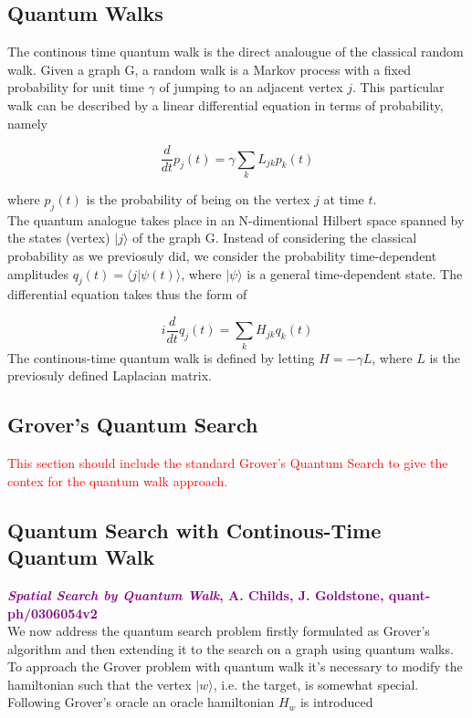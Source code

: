 \documentclass[aps,pra,reprint, onecolumn]{revtex4-2}
\newcommand{\red}[1]{\textcolor{red}{#1}}
\newcommand{\purple}[3]{\textcolor{purple}{\textbf{\textit{#1}, #2, #3}}}
\begin{document}
\subsection{Quantum Walks}
The continous time quantum walk is the direct analougue of the classical random walk. Given a graph G, a random walk is a Markov process with a fixed probability for unit time $\gamma$ of jumping to an adjacent vertex $j$. This particular walk can be described by a linear differential equation in terms of probability, namely

\begin{equation}
  \frac{d}{dt}p_j(t) = \gamma\sum_{k}L_{jk}p_k(t)
\end{equation}

where $p_j(t)$ is the probability of being on the vertex $j$ at time $t$.\\
The quantum analogue takes place in an N-dimentional Hilbert space spanned by the states (vertex) $|j\rangle$ of the graph G. Instead of considering the classical probability as we previosuly did, we consider the probability time-dependent amplitudes $q_j(t) = \langle j|\psi(t)\rangle$, where $|\psi\rangle$ is a general time-dependent state. The differential equation takes thus the form of

\begin{equation}
  i\frac{d}{dt}q_j(t) = \sum_{k}H_{jk}q_k(t)
\end{equation}
The continous-time quantum walk is defined by letting $H=-\gamma L$, where $L$ is the previosuly defined Laplacian matrix.

\subsection{Grover's Quantum Search}
\red{This section should include the standard Grover's Quantum Search to give the contex for the quantum walk approach.}

\subsection{Quantum Search with Continous-Time Quantum Walk}
\purple{Spatial Search by Quantum Walk}{A. Childs, J. Goldstone}{quant-ph/0306054v2}\\
We now address the quantum search problem firstly formulated as Grover's algorithm and then extending it to the search on a graph using quantum walks. \\
To approach the Grover problem with quantum walk it's necessary to modify the hamiltonian such that the vertex $|w\rangle$, i.e. the target, is somewhat special. Following Grover's oracle an oracle hamiltonian $H_w$ is introduced
\end{document}
